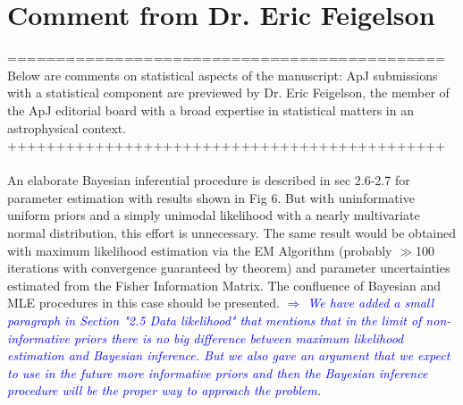 \documentclass[10pt,a4paper]{article}
\newcommand{\Comment}[1]{\textsl{\textcolor{Blue}{$\Longrightarrow$ {#1}}}}
\begin{document}
\section{Comment from Dr. Eric Feigelson}


=============================================\\
Below are comments on statistical aspects of the manuscript: ApJ submissions with a
statistical component are previewed by Dr. Eric Feigelson, the member of the ApJ
editorial board with a broad expertise in statistical matters in an astrophysical
context.\\
+++++++++++++++++++++++++++++++++++++++++++++\\\\

An elaborate Bayesian inferential procedure is described in sec 2.6-2.7 for parameter estimation with results shown in Fig 6. But with uninformative uniform priors and a simply unimodal likelihood with a nearly multivariate normal distribution, this effort is unnecessary. The same result would be obtained with maximum likelihood estimation via the EM Algorithm (probably $\gg$100 iterations with convergence guaranteed by theorem) and parameter uncertainties estimated from the Fisher Information Matrix. The confluence of Bayesian and MLE procedures in this
case should be presented. \Comment{We have added a small paragraph in Section "2.5 Data likelihood" that mentions that in the limit of non-informative priors there is no big difference between maximum likelihood estimation and Bayesian inference. But we also gave an argument that we expect to use in the future more informative priors and then the Bayesian inference procedure will be the proper way to approach the problem.}
\end{document}
